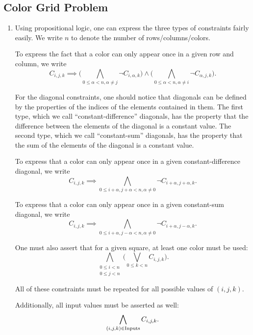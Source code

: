 \documentclass[journal,onecolumn]{IEEEtran}
\begin{document}
\subsection{Color Grid Problem}
\begin{enumerate}
	\item Using propositional logic, one can express the three types of constraints fairly easily.
	We write \(n\) to denote the number of rows/columns/colors.
	
	To express the fact that a color can only appear once in a given row and column, we write
	\[
	C_{i, j, k} \implies \Bigg(\bigwedge_{0 \le \alpha < n, \alpha \ne j} \lnot C_{i, \alpha, k}\Bigg) \land \Bigg(\bigwedge_{0 \le \alpha < n, \alpha \ne i} \lnot C_{\alpha, j, k}\Bigg).
	\]
	
	For the diagonal constraints, one should notice that diagonals can be defined by the properties of the indices of the elements contained in them.
	The first type, which we call ``constant-difference'' diagonals, has the property that the difference between the elements of the diagonal is a constant value.
	The second type, which we call ``constant-sum'' diagonals, has the property that the sum of the elements of the diagonal is a constant value.
	
	To express that a color can only appear once in a given constant-difference diagonal, we write
	\[
	C_{i, j, k} \implies \bigwedge_{0 \le i+\alpha, j+\alpha < n, \alpha \ne 0} \lnot C_{i+\alpha, j+\alpha, k}.
	\]
	
	To express that a color can only appear once in a given constant-sum diagonal, we write
	\[
	C_{i, j, k} \implies \bigwedge_{0 \le i+\alpha, j-\alpha < n, \alpha \ne 0} \lnot C_{i+\alpha, j-\alpha, k}.
	\]
	
	One must also assert that for a given square, at least one color must be used:
	\[
	\bigwedge_{\substack{0 \le i < n \\ 0 \le j < n}} \Bigg(\bigvee_{0 \le k < n} C_{i, j, k}\Bigg).
	\]
	
	All of these constraints must be repeated for all possible values of \((i, j, k)\).
	
	Additionally, all input values must be asserted as well:
	\[
	\bigwedge_{(i, j, k) \in \textnormal{Inputs}} C_{i, j, k}.
	\]
	

\end{enumerate}
\end{document}
